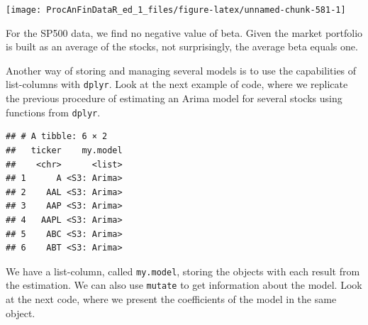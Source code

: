 \documentclass[11pt,]{book}
\newenvironment{Shaded}{\begin{snugshade}}{\end{snugshade}}
\newcommand{\KeywordTok}[1]{\textcolor[rgb]{0.27,0.27,0.27}{\textbf{#1}}}
\newcommand{\DataTypeTok}[1]{\textcolor[rgb]{0.27,0.27,0.27}{#1}}
\newcommand{\DecValTok}[1]{\textcolor[rgb]{0.06,0.06,0.06}{#1}}
\newcommand{\StringTok}[1]{\textcolor[rgb]{0.5,0.5,0.5}{#1}}
\newcommand{\OperatorTok}[1]{\textcolor[rgb]{0.81,0.36,0.00}{\textbf{#1}}}
\newcommand{\NormalTok}[1]{#1}
\begin{document}
\begin{center}\texttt{[image: ProcAnFinDataR\_ed\_1\_files/figure-latex/unnamed-chunk-581-1]} \end{center}

For the SP500 data, we find no negative value of beta. Given the market
portfolio is built as an average of the stocks, not surprisingly, the
average beta equals one.

Another way of storing and managing several models is to use the
capabilities of list-columns with \texttt{dplyr}. Look at the next
example of code, where we replicate the previous procedure of estimating
an Arima model for several stocks using functions from \texttt{dplyr}.

\begin{Shaded}
\end{Shaded}

\begin{verbatim}
## # A tibble: 6 × 2
##   ticker    my.model
##    <chr>      <list>
## 1      A <S3: Arima>
## 2    AAL <S3: Arima>
## 3    AAP <S3: Arima>
## 4   AAPL <S3: Arima>
## 5    ABC <S3: Arima>
## 6    ABT <S3: Arima>
\end{verbatim}

We have a list-column, called \texttt{my.model}, storing the objects
with each result from the estimation. We can also use \texttt{mutate} to
get information about the model. Look at the next code, where we present
the coefficients of the model in the same object.
\end{document}

